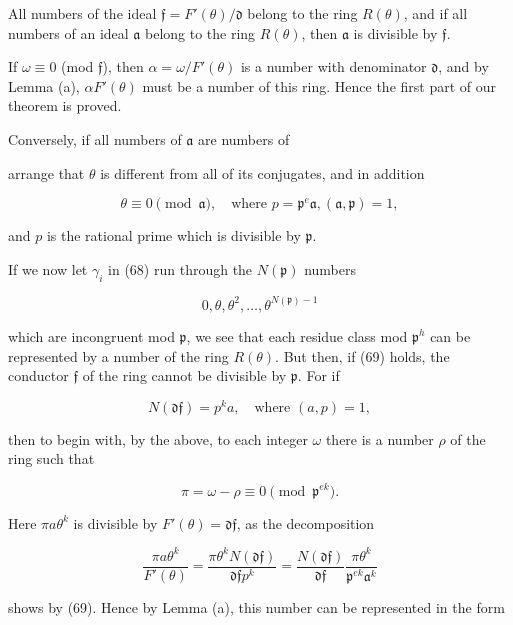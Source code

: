 All numbers of the ideal $\mathfrak{f} = F'(\theta)/\mathfrak{d}$ belong to the ring $R(\theta)$, and if all numbers of an ideal $\mathfrak{a}$ belong to the ring $R(\theta)$, then $\mathfrak{a}$ is divisible by $\mathfrak{f}$.

If $\omega \equiv 0$ (mod $\mathfrak{f}$), then $\alpha = \omega/F'(\theta)$ is a number with denominator $\mathfrak{d}$, and by Lemma (a), $\alpha F'(\theta)$ must be a number of this ring. Hence the first part of our theorem is proved.

Conversely, if all numbers of $\mathfrak{a}$ are numbers of

arrange that $\theta$ is different from all of its conjugates, and in addition

$$\theta \equiv 0 \pmod{\mathfrak{a}}, \quad \text{where } p = \mathfrak{p}^e \mathfrak{a}, (\mathfrak{a}, \mathfrak{p}) = 1,$$

and $p$ is the rational prime which is divisible by $\mathfrak{p}$.

If we now let $\gamma_i$ in (68) run through the $N(\mathfrak{p})$ numbers

$$0, \theta, \theta^2, \ldots, \theta^{N(\mathfrak{p})-1}$$

which are incongruent mod $\mathfrak{p}$, we see that each residue class mod $\mathfrak{p}^h$ can be represented by a number of the ring $R(\theta)$. But then, if (69) holds, the conductor $\mathfrak{f}$ of the ring cannot be divisible by $\mathfrak{p}$. For if

$$N(\mathfrak{d}\mathfrak{f}) = p^k a, \quad \text{where } (a, p) = 1,$$

then to begin with, by the above, to each integer $\omega$ there is a number $\rho$ of the ring such that

$$\pi = \omega - \rho \equiv 0 \pmod{\mathfrak{p}^{ek}}.$$

Here $\pi a\theta^k$ is divisible by $F'(\theta) = \mathfrak{d}\mathfrak{f}$, as the decomposition

$$\frac{\pi a\theta^k}{F'(\theta)} = \frac{\pi\theta^k N(\mathfrak{d}\mathfrak{f})}{\mathfrak{d}\mathfrak{f}p^k} = \frac{N(\mathfrak{d}\mathfrak{f})}{\mathfrak{d}\mathfrak{f}} \frac{\pi\theta^k}{\mathfrak{p}^{ek}\mathfrak{a}^k}$$

shows by (69). Hence by Lemma (a), this number can be represented in the form

$$\
